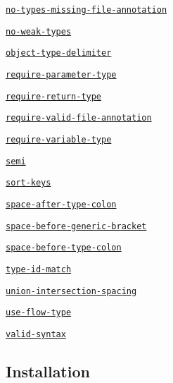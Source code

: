 \begin{DoxyItemize}
\begin{DoxyItemize}
\begin{DoxyItemize}
\item \href{#eslint-plugin-flowtype-rules-no-types-missing-file-annotation}{\tt {\ttfamily no-\/types-\/missing-\/file-\/annotation}}
\item \href{#eslint-plugin-flowtype-rules-no-weak-types}{\tt {\ttfamily no-\/weak-\/types}}
\item \href{#eslint-plugin-flowtype-rules-object-type-delimiter}{\tt {\ttfamily object-\/type-\/delimiter}}
\item \href{#eslint-plugin-flowtype-rules-require-parameter-type}{\tt {\ttfamily require-\/parameter-\/type}}
\item \href{#eslint-plugin-flowtype-rules-require-return-type}{\tt {\ttfamily require-\/return-\/type}}
\item \href{#eslint-plugin-flowtype-rules-require-valid-file-annotation}{\tt {\ttfamily require-\/valid-\/file-\/annotation}}
\item \href{#eslint-plugin-flowtype-rules-require-variable-type}{\tt {\ttfamily require-\/variable-\/type}}
\item \href{#eslint-plugin-flowtype-rules-semi}{\tt {\ttfamily semi}}
\item \href{#eslint-plugin-flowtype-rules-sort-keys}{\tt {\ttfamily sort-\/keys}}
\item \href{#eslint-plugin-flowtype-rules-space-after-type-colon}{\tt {\ttfamily space-\/after-\/type-\/colon}}
\item \href{#eslint-plugin-flowtype-rules-space-before-generic-bracket}{\tt {\ttfamily space-\/before-\/generic-\/bracket}}
\item \href{#eslint-plugin-flowtype-rules-space-before-type-colon}{\tt {\ttfamily space-\/before-\/type-\/colon}}
\item \href{#eslint-plugin-flowtype-rules-type-id-match}{\tt {\ttfamily type-\/id-\/match}}
\item \href{#eslint-plugin-flowtype-rules-union-intersection-spacing}{\tt {\ttfamily union-\/intersection-\/spacing}}
\item \href{#eslint-plugin-flowtype-rules-use-flow-type}{\tt {\ttfamily use-\/flow-\/type}}
\item \href{#eslint-plugin-flowtype-rules-valid-syntax}{\tt {\ttfamily valid-\/syntax}}
\end{DoxyItemize}
\end{DoxyItemize}
\end{DoxyItemize}

\label{_eslint-plugin-flowtype-installation}%
 \subsection*{Installation}


